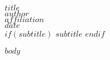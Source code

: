 \documentclass[letterpaper,11pt,twoside]{memoir}
\begin{document}
  


\begin{flushleft}
\titlefont\normalsize{$title$} \\ 
\vspace{.2cm}
\rmfamily\footnotesize{$author$} \\
\rmfamily\footnotesize{$affiliation$}  \\
\rmfamily\footnotesize{$date$} \\
$if(subtitle)$
\vspace{.6cm}
\titlefont\LARGE{$subtitle$} 
$endif$
\end{flushleft}







$body$


\end{document}
